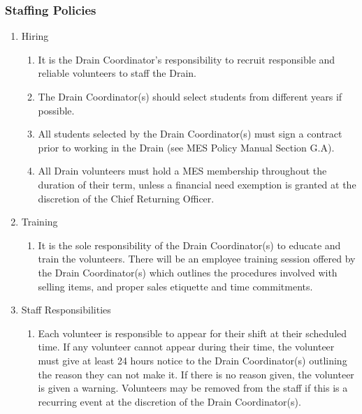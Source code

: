 \subsubsection{Staffing Policies}
\label{staffing-policies}

\begin{enumerate}
 \item
  Hiring

  \begin{enumerate}
   \item
    It is the Drain Coordinator's responsibility to recruit responsible
    and reliable volunteers to staff the Drain.
   \item
    The Drain Coordinator(s) should select students from different years
    if possible.
   \item
    All students selected by the Drain Coordinator(s) must sign a
    contract prior to working in the Drain (see MES Policy Manual
    Section G.A). %
   \item
    All Drain volunteers must hold a MES membership throughout the
    duration of their term, unless a financial need exemption is granted
    at the discretion of the Chief Returning Officer.
  \end{enumerate}
 \item
  Training

  \begin{enumerate}
   \item
    It is the sole responsibility of the Drain Coordinator(s) to educate
    and train the volunteers. There will be an employee training session
    offered by the Drain Coordinator(s) which outlines the procedures
    involved with selling items, and proper sales etiquette and time
    commitments.
  \end{enumerate}
 \item
  Staff Responsibilities

  \begin{enumerate}
   \item
    Each volunteer is responsible to appear for their shift at their
    scheduled time. If any volunteer cannot appear during their time,
    the volunteer must give at least 24 hours notice to the Drain
    Coordinator(s) outlining the reason they can not make it. If there
    is no reason given, the volunteer is given a warning. Volunteers may
    be removed from the staff if this is a recurring event at the
    discretion of the Drain Coordinator(s).
  \end{enumerate}
\end{enumerate}


